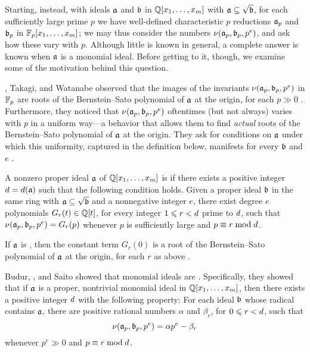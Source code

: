 \documentclass{amsart}
\begin{document}
Starting, instead, with ideals $\mathfrak{a}$ and $\mathfrak{b}$ in $\mathbb{Q}[x_1,\ldots,x_m]$ with $\mathfrak{a} \subseteq \sqrt {\mathfrak{b}}$, for each sufficiently large prime $p$ we have well-defined characteristic $p$ reductions $\mathfrak{a}_p$ and $\mathfrak{b}_p$ in $\mathbb{F}_p[x_1,\ldots,x_m]$; we may thus consider the numbers $\nu(\mathfrak{a}_p,\mathfrak{b}_p,p^e)$, and ask how these vary with $p$.
Although little is known in general, a complete answer is known when $\mathfrak{a}$ is a monomial ideal.
Before getting to it, though, we examine some of the motivation behind this question.

\mustata, Takagi, and Watanabe observed that the images of the invariants $\nu(\mathfrak{a}_p,\mathfrak{b}_p,p^e)$ in $\mathbb{F}_p$ are roots of the Bernstein--Sato polynomial of $\mathfrak{a}$ at the origin, for each $p \gg 0$ \cite[Proposition~3.11]{mustata+takagi+watanabe.F-thresholds}.
Furthermore, they noticed that $\nu(\mathfrak{a}_p,\mathfrak{b}_p,p^e)$ oftentimes (but not always) varies with $p$ in a uniform way---a behavior that allows them to find \emph{actual} roots of the Bernstein--Sato polynomial of $\mathfrak{a}$ at the origin.
They ask for conditions on $\mathfrak{a}$ under which this uniformity, captured in the definition below, manifests for every $\mathfrak{b}$ and $e$ \cite[Problem~3.8]{mustata+takagi+watanabe.F-thresholds}.

\begin{definition}
   \label{defn: nuCool}
   A nonzero proper ideal $\mathfrak{a}$ of $\mathbb{Q}[x_1,\ldots,x_m]$ is \emph{\nuCool} if there exists a positive integer $d = d(\mathfrak{a})$ such that the following condition holds.
   Given a proper ideal $\mathfrak{b}$ in the same ring with $\mathfrak{a} \subseteq \sqrt {\mathfrak{b}}$ and a nonnegative integer $e$, there exist degree $e$ polynomials $G_r(t) \in \mathbb{Q}[t]$, for every integer $1 \leqslant r < d$ prime to $d$, such that $\nu(\mathfrak{a}_p, \mathfrak{b}_p, p^e) = G_r(p)$ whenever $p$ is sufficiently large and $p \equiv r \bmod d$.
\end{definition}

If $\mathfrak{a}$ is \nuCool, then the constant term $G_r(0)$ is a root of the Bernstein--Sato polynomial of $\mathfrak{a}$ at the origin, for each $r$ as above \cite[Remark~3.13]{mustata+takagi+watanabe.F-thresholds}.

Budur, \mustata, and Saito showed that monomial ideals are \nuCool \cite[Theorem~4.1]{budur+mustata+saito.roots_bs_polys}.
Specifically, they showed that if $\mathfrak{a}$ is a proper, nontrivial monomial ideal in $\mathbb{Q}[x_1,\ldots,x_m]$, then there exists a positive integer $d$ with the following property:
For each ideal $\mathfrak{b}$ whose radical contains $\mathfrak{a}$, there are positive rational numbers $\alpha$ and $\beta_r$, for $0 \leqslant r < d$, such that
\begin{equation}
   \label{eq: nu-uniformity for monomial ideals}
   \nu(\mathfrak{a}_p, \mathfrak{b}_p, p^e) = \alpha p^e - \beta_r
\end{equation}
whenever $p^e \gg 0$ and $p \equiv r \bmod d$.
\end{document}
